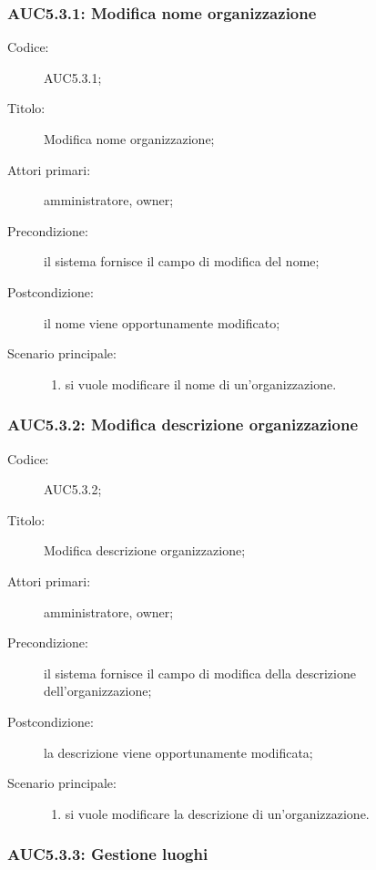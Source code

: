 \documentclass[../../../analisi-dei-requisiti.tex]{subfiles}
\begin{document}
\subsubsection{AUC5.3.1: Modifica nome organizzazione}%
\label{subs:AUC5.3.1}
\begin{description}
  \item[Codice:] AUC5.3.1;
  \item[Titolo:] Modifica nome organizzazione;
  \item[Attori primari:] amministratore, owner;
  \item[Precondizione:] il sistema fornisce il campo di modifica del nome;
  \item[Postcondizione:] il nome viene opportunamente modificato;
  \item[Scenario principale:]
        \begin{enumerate}
          \item si vuole modificare il nome di un'organizzazione.
        \end{enumerate}
\end{description}

\subsubsection{AUC5.3.2: Modifica descrizione organizzazione}%
\label{subs:AUC5.3.2}
\begin{description}
  \item[Codice:] AUC5.3.2;
  \item[Titolo:] Modifica descrizione organizzazione;
  \item[Attori primari:] amministratore, owner;
  \item[Precondizione:] il sistema fornisce il campo di modifica della descrizione dell'organizzazione;
  \item[Postcondizione:] la descrizione viene opportunamente modificata;
  \item[Scenario principale:]
        \begin{enumerate}
          \item si vuole modificare la descrizione di un'organizzazione.
        \end{enumerate}
\end{description}


\subsubsection{AUC5.3.3: Gestione luoghi}%
\label{subs:AUC5.3.3}
\end{document}
